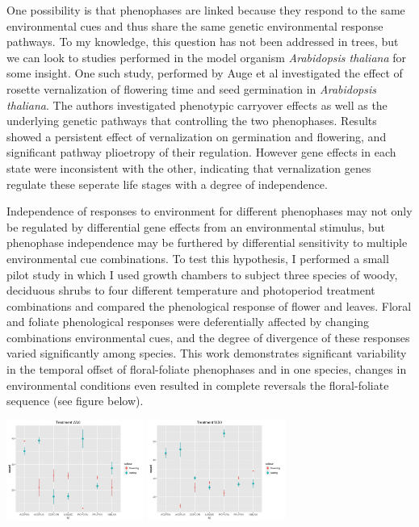 \documentclass{article}\usepackage[]{graphicx}\usepackage[]{color}
\begin{document}
\par One possibility is that phenophases are linked because they respond to the same environmental cues and thus share the same genetic environmental response pathways. To my knowledge, this question has not been addressed in trees, but we can look to studies performed in the model organism \textit{Arabidopsis thaliana} for some insight. One such study, performed by Auge et al \citeyear{Auge2017} investigated the effect of rosette vernalization of flowering time and seed germination in \textit{Arabidopsis thaliana}. The authors investigated phenotypic carryover effects as well as the underlying genetic pathways that controlling the two phenophases. Results showed a persistent effect of vernalization on germination and flowering, and significant pathway plioetropy of their regulation. However gene effects in each state were inconsistent with the other, indicating that vernalization genes regulate these seperate life stages with a degree of independence.
\par Independence of responses to environment for different phenophases may not only be regulated by differential gene effects from an environmental stimulus, but phenophase independence may be furthered by differential sensitivity to multiple environmental cue combinations. To test this hypothesis, I performed a small pilot study in which I used growth chambers to  subject three species of woody, deciduous shrubs to four different temperature and photoperiod treatment combinations and compared the phenological response of flower and leaves. Floral and foliate phenological responses were deferentially affected by changing combinations environmental cues, and  the degree of divergence of these responses varied significantly among species. This work demonstrates significant variability in the temporal offset of floral-foliate phenophases and in one species, changes in environmental conditions even resulted in complete reversals the floral-foliate sequence (see figure below).\\
\includegraphics[width=4.5cm,height=4cm] {WL0}
\includegraphics[width=4.5cm,height=4cm]{WS0}
\end{document}
